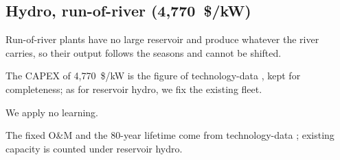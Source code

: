 \subsection{Hydro, run-of-river (4,770~\$/kW)}\label{sec:ror}
Run-of-river plants have no large reservoir and produce whatever the river carries, so their output follows the seasons and cannot be shifted.

The CAPEX of 4,770~\$/kW is the figure of technology-data \citep{technologydata}, kept for completeness; as for reservoir hydro, we fix the existing fleet.

We apply no learning.

The fixed O\&M and the 80-year lifetime come from technology-data \citep{technologydata}; existing capacity is counted under reservoir hydro.
